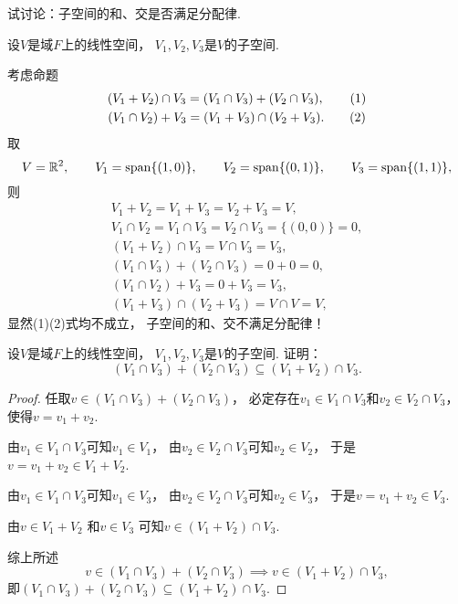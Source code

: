 \begin{example}
试讨论：子空间的和、交是否满足分配律.
\begin{solution}
设\(V\)是域\(F\)上的线性空间，
\(V_1,V_2,V_3\)是\(V\)的子空间.

考虑命题\begin{gather*}
	(V_1 + V_2) \cap V_3
	= (V_1 \cap V_3) + (V_2 \cap V_3),
	\tag1 \\
	(V_1 \cap V_2) + V_3
	= (V_1 + V_3) \cap (V_2 + V_3).
	\tag2
\end{gather*}
取\begin{equation*}
	V = \mathbb{R}^2,
	\qquad
	V_1 = \Span\{(1,0)\},  %
	\qquad
	V_2 = \Span\{(0,1)\},  %
	\qquad
	V_3 = \Span\{(1,1)\},  %
\end{equation*}
则\begin{gather*}
	V_1 + V_2
	= V_1 + V_3
	= V_2 + V_3
	= V, \\
	V_1 \cap V_2
	= V_1 \cap V_3
	= V_2 \cap V_3
	= \{ (0,0) \}
	= 0, \\
	(V_1 + V_2) \cap V_3
	= V \cap V_3
	= V_3, \\
	(V_1 \cap V_3) + (V_2 \cap V_3)
	= 0 + 0
	= 0, \\
	(V_1 \cap V_2) + V_3
	= 0 + V_3
	= V_3, \\
	(V_1 + V_3) \cap (V_2 + V_3)
	= V \cap V
	= V,
\end{gather*}
显然(1)(2)式均不成立，
子空间的和、交不满足分配律！
\end{solution}
\end{example}
\begin{example}
设\(V\)是域\(F\)上的线性空间，
\(V_1,V_2,V_3\)是\(V\)的子空间.
证明：\begin{equation}
	(V_1 \cap V_3) + (V_2 \cap V_3) \subseteq (V_1 + V_2) \cap V_3.
\end{equation}
\begin{proof}
任取\(v \in (V_1 \cap V_3) + (V_2 \cap V_3)\)，
必定存在\(v_1 \in V_1 \cap V_3\)和\(v_2 \in V_2 \cap V_3\)，
使得\(v = v_1 + v_2\).

由\(v_1 \in V_1 \cap V_3\)可知\(v_1 \in V_1\)，
由\(v_2 \in V_2 \cap V_3\)可知\(v_2 \in V_2\)，
于是\(v = v_1 + v_2 \in V_1 + V_2\).

由\(v_1 \in V_1 \cap V_3\)可知\(v_1 \in V_3\)，
由\(v_2 \in V_2 \cap V_3\)可知\(v_2 \in V_3\)，
于是\(v = v_1 + v_2 \in V_3\).

由\(v \in V_1 + V_2\)
和\(v \in V_3\)
可知\(v \in (V_1 + V_2) \cap V_3\).

综上所述\begin{equation*}
	v \in (V_1 \cap V_3) + (V_2 \cap V_3)
	\implies
	v \in (V_1 + V_2) \cap V_3,
\end{equation*}
即\((V_1 \cap V_3) + (V_2 \cap V_3) \subseteq (V_1 + V_2) \cap V_3\).
\end{proof}
\end{example}
